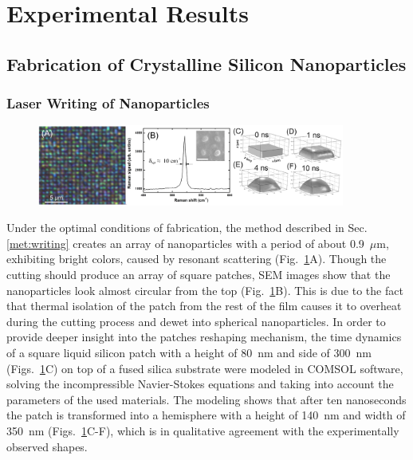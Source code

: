 \section{Experimental Results}
    \subsection{Fabrication of Crystalline Silicon Nanoparticles}
        \label{sec:Fabrication}

        \subsubsection{Laser Writing of Nanoparticles}

            \begin{figure}[!ht]
                    \begin{center}
                        \includegraphics[width=0.9\textwidth]{figs/results/fab/LaserWriting.eps}
                    \end{center}
                    \caption{}
                    \label{fig:LaserWriting}
            \end{figure}

            Under the optimal conditions of fabrication, the method described in Sec. \ref{met:writing} creates an array of nanoparticles with a period of about 0.9~$\mu$m,
            exhibiting bright colors, caused by resonant scattering (Fig.~\ref{fig:LaserWriting}A). Though the cutting should
            produce an array of square patches, SEM images show that the nanoparticles look almost circular from the top
            (Fig.~\ref{fig:LaserWriting}B). This is due to the fact that thermal isolation of the patch from the rest of the film causes it to overheat
            during the cutting process and dewet into spherical nanoparticles. In order to provide deeper insight into the patches reshaping mechanism,
            the time dynamics of a square liquid silicon patch with a height of 80~nm and side of 300~nm
            (Figs.~\ref{fig:LaserWriting}C) on top of a fused silica substrate were modeled in COMSOL software, solving the incompressible Navier-Stokes
            equations and taking into account the parameters of the used materials. The modeling shows that after ten nanoseconds
            the patch is transformed into a hemisphere with a height of 140~nm and width of 350~nm (Figs.~\ref{fig:LaserWriting}C-F),
            which is in qualitative agreement with the experimentally observed shapes.


